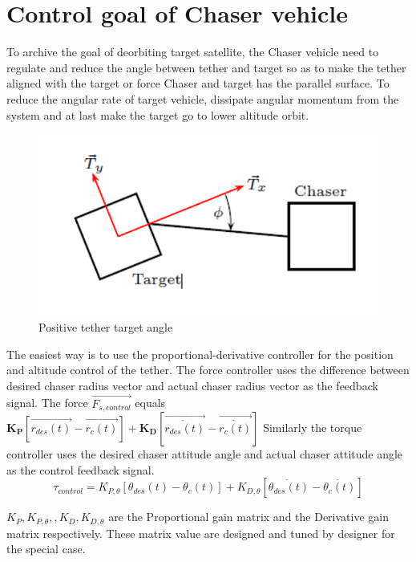 \section{Control goal of Chaser vehicle}
To archive the goal of deorbiting target satellite, the Chaser vehicle need to regulate and reduce the angle between tether and target so as to make the tether aligned with the target or force Chaser and target has the parallel surface. To reduce the angular rate of target vehicle, dissipate angular momentum from the system and at last make the target go to lower altitude orbit.
\begin{figure}
\centering
\includegraphics{fig/simulation/TetherTargetAngle}
\caption{Positive tether target angle}
\end{figure}
The easiest way is to use the proportional-derivative controller for the position and altitude control of the tether.
The force controller uses the difference between desired chaser radius vector and actual chaser radius vector as the feedback signal. The force $\overrightarrow{F_{s,control}}$ equals $\mathbf{K_P}\left[\overrightarrow{r_{des}(t)}-\overrightarrow{r_c(t)}\right]+\mathbf{K_D}\left[\overrightarrow{\dot{r_{des}(t)}}-\overrightarrow{\dot{r_c(t)}}\right]$
Similarly the torque controller uses the desired chaser attitude angle and actual chaser attitude angle as the control feedback signal.
\begin{equation}
\tau_{control} =K_{P,\theta}\left[\theta_{des}(t)-\theta_c(t)\right] + K_{D,\theta}\left[\dot{\theta_{des}(t)}-\dot{\theta_c(t)}\right]
\end{equation}

$K_P,K_{P,\theta},, K_D,K_{D,\theta}$ are the Proportional gain matrix and the Derivative gain matrix respectively. These matrix value are designed and tuned by designer for the special case.


